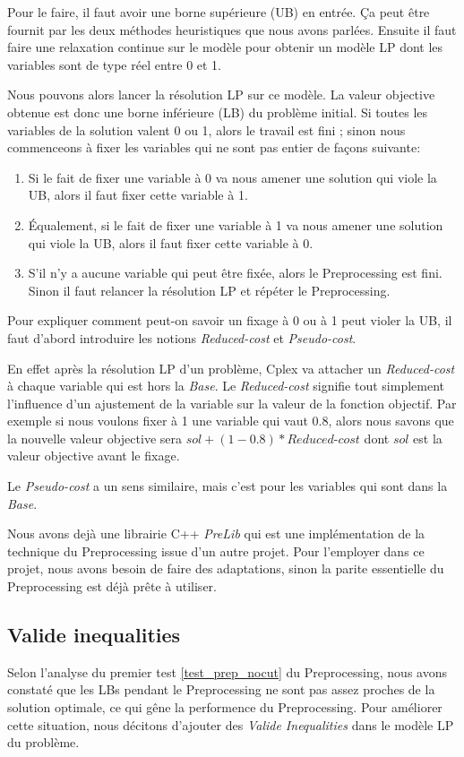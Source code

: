 Pour le faire, il faut avoir une borne supérieure (UB) en entrée. Ça peut être fournit par les deux méthodes heuristiques que nous avons parlées. Ensuite il faut faire une relaxation continue sur le modèle pour obtenir un modèle LP dont les variables sont de type réel entre 0 et 1. 

Nous pouvons alors lancer la résolution LP sur ce modèle. La valeur objective obtenue est donc une borne inférieure (LB) du problème initial. Si toutes les variables de la solution valent 0 ou 1, alors le travail est fini ; sinon nous commenceons à fixer les variables qui ne sont pas entier de façons suivante: 

\begin{enumerate}
	\item Si le fait de fixer une variable à 0 va nous amener une solution qui viole la UB, alors il faut fixer cette variable à 1.
	\item Équalement, si le fait de fixer une variable à 1 va nous amener une solution qui viole la UB, alors il faut fixer cette variable à 0.
	\item S'il n'y a aucune variable qui peut être fixée, alors le Preprocessing est fini. Sinon il faut relancer la résolution LP et répéter le Preprocessing.
\end{enumerate}

Pour expliquer comment peut-on savoir un fixage à 0 ou à 1 peut violer la UB, il faut d'abord introduire les notions \textit{Reduced-cost} et \textit{Pseudo-cost}.

En effet après la résolution LP d'un problème, Cplex va attacher un \textit{Reduced-cost} à chaque variable qui est hors la \textit{Base}. Le \textit{Reduced-cost} signifie tout simplement l'influence d'un ajustement de la variable sur la valeur de la fonction objectif. Par exemple si nous voulons fixer à 1 une variable qui vaut 0.8, alors nous savons que la nouvelle valeur objective sera $sol+(1-0.8)*\textit{Reduced-cost}$ dont $sol$ est la valeur objective avant le fixage.

Le \textit{Pseudo-cost} a un sens similaire, mais c'est pour les variables qui sont dans la \textit{Base}.

Nous avons dejà une librairie C++ \textit{PreLib} qui est une implémentation de la technique du Preprocessing issue d'un autre projet. Pour l'employer dans ce projet, nous avons besoin de faire des adaptations, sinon la parite essentielle du Preprocessing est déjà prête à utiliser.

\subsection{Valide inequalities}
Selon l'analyse du premier test \ref{test_prep_nocut} du Preprocessing, nous avons constaté que les LBs pendant le Preprocessing ne sont pas assez proches de la solution optimale, ce qui gêne la performence du Preprocessing. Pour améliorer cette situation, nous décitons d'ajouter des \textit{Valide Inequalities} dans le modèle LP du problème.

